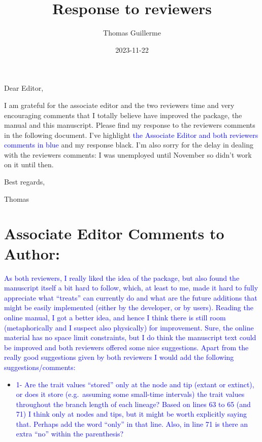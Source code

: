 \documentclass[
]{article}
\title{Response to reviewers}
\author{Thomas Guillerme}
\date{2023-11-22}
\providecommand{\tightlist}{%
  \setlength{\itemsep}{0pt}\setlength{\parskip}{0pt}}
\begin{document}
\maketitle

Dear Editor,

I am grateful for the associate editor and the two reviewers time and
very encouraging comments that I totally believe have improved the
package, the manual and this manuscript. Please find my response to the
reviewers comments in the following document. I've highlight \textcolor{blue}{the
Associate Editor and both reviewers comments in blue} and my response
black. I'm also sorry for the delay in dealing with the reviewers
comments: I was unemployed until November so didn't work on it until
then.

Best regards,

Thomas

\hypertarget{associate-editor-comments-to-author}{%
\section{Associate Editor Comments to
Author:}\label{associate-editor-comments-to-author}}

\textcolor{blue}{As both reviewers, I really liked the idea of the package, but also
found the manuscript itself a bit hard to follow, which, at least to me,
made it hard to fully appreciate what ``treats'' can currently do and
what are the future additions that might be easily implemented (either
by the developer, or by users). Reading the online manual, I got a
better idea, and hence I think there is still room (metaphorically and I
suspect also physically) for improvement. Sure, the online material has
no space limit constraints, but I do think the manuscript text could be
improved and both reviewers offered some nice suggestions. Apart from
the really good suggestions given by both reviewers I would add the
following suggestions/comments:}

\begin{itemize}
\tightlist
\item
  \textcolor{blue}{1- Are the trait values ``stored'' only at the node and tip (extant
  or extinct), or does it store (e.g.~assuming some small-time
  intervals) the trait values throughout the branch length of each
  lineage? Based on lines 63 to 65 (and 71) I think only at nodes and
  tips, but it might be worth explicitly saying that. Perhaps add the
  word ``only'' in that line. Also, in line 71 is there an extra ``no''
  within the parenthesis?}
\end{itemize}
\end{document}
